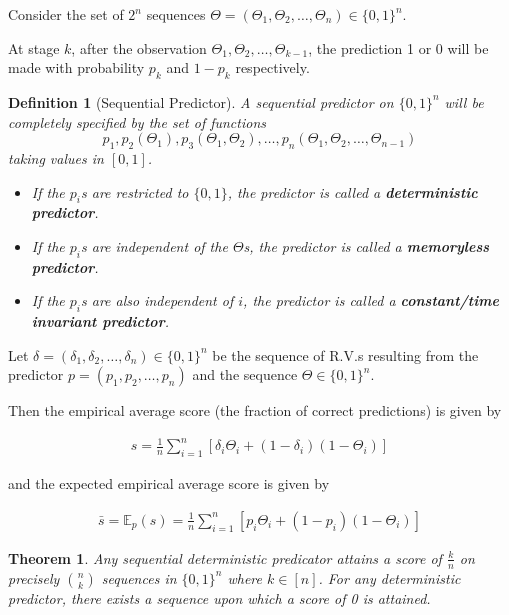 \documentclass[11pt]{article}
\numberwithin{equation}{section}
\theoremstyle{boldStyle}
\newtheorem{theorem}{Theorem}[section]
\newtheorem{definition}{Definition}[section]
\begin{document}
Consider the set of $2^n$ sequences $\Theta = (\Theta_1, \Theta_2, \ldots, \Theta_{n}) \in \{0, 1\}^n$.

At stage $k$, after the observation $\Theta_1, \Theta_2, \ldots, \Theta_{k-1}$, the prediction 1 or 0 will be made with probability $p_k$ and $1-p_k$ respectively.

\begin{definition}[Sequential Predictor]
    A sequential predictor on $\{0, 1\}^n$ will be completely specified by the set of functions 
    \[
        p_1, p_2(\Theta_1), p_3(\Theta_1, \Theta_2), \ldots, p_n(\Theta_1, \Theta_2, \ldots, \Theta_{n-1})
    \]
    taking values in $[0, 1]$.
    \begin{itemize}
        \item If the $p_i$s are restricted to $\{0, 1\}$, the predictor is called a \textbf{deterministic predictor}.
        \item If the $p_i$s are independent of the $\Theta$s, the predictor is called a \textbf{memoryless predictor}.
        \item If the $p_i$s are also independent of $i$, the predictor is called a \textbf{constant/time invariant predictor}.
    \end{itemize}
\end{definition}

Let $\delta = (\delta_1, \delta_2, \ldots, \delta_n) \in \{0, 1\}^n$ be the sequence of R.V.s resulting from the predictor $p = (p_1, p_2, \ldots, p_n)$ and the sequence $\Theta \in \{0, 1\}^n$.

Then the empirical average score (the fraction of correct predictions) is given by

\begin{align}
    s = \frac{1}{n} \sum_{i=1}^{n} [\delta_i \Theta_i + (1 - \delta_i)(1 - \Theta_i)]
\end{align}

and the expected empirical average score is given by

\begin{align}
    \bar{s} = \mathbb{E}_{p}(s) =  \frac{1}{n} \sum_{i=1}^{n} [p_i \Theta_i + (1 - p_i)(1 - \Theta_i)] 
\end{align}

\begin{theorem}
    Any sequential deterministic predicator attains a score of $\frac{k}{n}$ on precisely $\binom{n}{k}$ sequences in $\{0, 1\}^n$ where $k \in [n]$.
    For any deterministic predictor, there exists a sequence upon which a score of 0 is attained.
\end{theorem}
\end{document}
